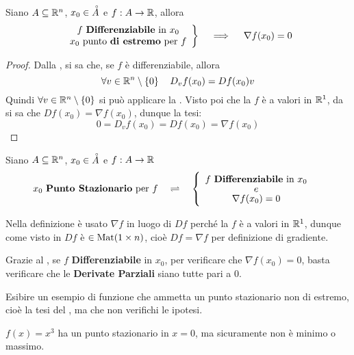 \begin{theorem}[di Fermat]
	\label{teo:fermat}
	Siano $A \subseteq \mathbb{R}^n$, $x_0 \in \accentset{\circ}{A}$ e $f: A \to \mathbb{R}$, allora
	\[
		\left.
			\begin{array}{c}
				f \text{ \textbf{Differenziabile} in } x_0\\
				x_0 \text{ punto \textbf{di estremo} per } f
			\end{array}
		\right\}
		\quad \implies \quad
		\nabla f(x_0) = 0
	\]
	\begin{proof}
		Dalla , si sa che, se $f$ è differenziabile, allora
		\[\forall v \in \mathbb{R}^n \setminus \left\{0\right\} \quad D_vf(x_0) = Df(x_0) v\]
		Quindi $\forall v \in \mathbb{R}^n \setminus \left\{0\right\}$ si può applicare la . Visto poi che la $f$ è a valori in $\mathbb{R}^1$, da  si sa che $Df(x_0) = \nabla f(x_0)$, dunque la tesi:
		\[0 = D_vf(x_0) = Df(x_0) = \nabla f(x_0)\]
	\end{proof}
\end{theorem}
\begin{definition}
	\label{def:pto_staz}
	Siano $A \subseteq \mathbb{R}^n$, $x_0 \in \accentset{\circ}{A}$ e $f: A \to \mathbb{R}$
	\[
		x_0 \text{ \textbf{Punto Stazionario} per } f
		\quad \rightleftharpoons \quad
		\begin{cases}
			\begin{array}{c}
				f \text{ \textbf{Differenziabile} in } x_0\\[-1ex]
				e\\[-1ex]
				\nabla f(x_0) = 0
			\end{array}
		\end{cases}
	\]
	\begin{note}
		Nella definizione è usato $\nabla f$ in luogo di $Df$ perché la $f$ è a valori in $\mathbb{R}^1$, dunque come visto in  $Df$ è $\in \operatorname{Mat}(1 \times n)$, cioè $Df = \nabla f$ per definizione di gradiente.
	\end{note}
\end{definition}
\begin{observation}
	Grazie al , se $f$ \textbf{Differenziabile} in $x_0$, per verificare che $\nabla f(x_0) = 0$, basta verificare che le \textbf{Derivate Parziali} siano tutte pari a $0$.
\end{observation}
\begin{exercise}
	Esibire un esempio di funzione che ammetta un punto stazionario non di estremo, cioè la tesi del , ma che non verifichi le ipotesi.
	\begin{solution}
		$f(x) = x^3$ ha un punto stazionario in $x=0$, ma sicuramente non è minimo o massimo.
	\end{solution}
\end{exercise}
